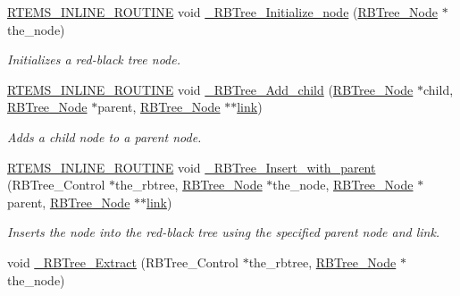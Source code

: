 \begin{DoxyCompactItemize}
\mbox{\hyperlink{group__RTEMSScoreBaseDefs_gac216239df231d5dbd15e3520b0b9313f}{R\+T\+E\+M\+S\+\_\+\+I\+N\+L\+I\+N\+E\+\_\+\+R\+O\+U\+T\+I\+NE}} void \mbox{\hyperlink{group__RTEMSScoreRBTree_gabbc757c2fd03694b6f9bb5aa2be553ff}{\+\_\+\+R\+B\+Tree\+\_\+\+Initialize\+\_\+node}} (\mbox{\hyperlink{structRBTree__Node}{R\+B\+Tree\+\_\+\+Node}} $\ast$the\+\_\+node)
\begin{DoxyCompactList}\small\item\em Initializes a red-\/black tree node. \end{DoxyCompactList}\item 
\mbox{\hyperlink{group__RTEMSScoreBaseDefs_gac216239df231d5dbd15e3520b0b9313f}{R\+T\+E\+M\+S\+\_\+\+I\+N\+L\+I\+N\+E\+\_\+\+R\+O\+U\+T\+I\+NE}} void \mbox{\hyperlink{group__RTEMSScoreRBTree_ga19978673ca0cb615f8228e4888d2c53c}{\+\_\+\+R\+B\+Tree\+\_\+\+Add\+\_\+child}} (\mbox{\hyperlink{structRBTree__Node}{R\+B\+Tree\+\_\+\+Node}} $\ast$child, \mbox{\hyperlink{structRBTree__Node}{R\+B\+Tree\+\_\+\+Node}} $\ast$parent, \mbox{\hyperlink{structRBTree__Node}{R\+B\+Tree\+\_\+\+Node}} $\ast$$\ast$\mbox{\hyperlink{link_8c_a8c94afd0b7e5bb4ce95fefd964241f7f}{link}})
\begin{DoxyCompactList}\small\item\em Adds a child node to a parent node. \end{DoxyCompactList}\item 
\mbox{\hyperlink{group__RTEMSScoreBaseDefs_gac216239df231d5dbd15e3520b0b9313f}{R\+T\+E\+M\+S\+\_\+\+I\+N\+L\+I\+N\+E\+\_\+\+R\+O\+U\+T\+I\+NE}} void \mbox{\hyperlink{group__RTEMSScoreRBTree_ga4fd457fb2e3eaacda2c13a5ab05a11e7}{\+\_\+\+R\+B\+Tree\+\_\+\+Insert\+\_\+with\+\_\+parent}} (R\+B\+Tree\+\_\+\+Control $\ast$the\+\_\+rbtree, \mbox{\hyperlink{structRBTree__Node}{R\+B\+Tree\+\_\+\+Node}} $\ast$the\+\_\+node, \mbox{\hyperlink{structRBTree__Node}{R\+B\+Tree\+\_\+\+Node}} $\ast$parent, \mbox{\hyperlink{structRBTree__Node}{R\+B\+Tree\+\_\+\+Node}} $\ast$$\ast$\mbox{\hyperlink{link_8c_a8c94afd0b7e5bb4ce95fefd964241f7f}{link}})
\begin{DoxyCompactList}\small\item\em Inserts the node into the red-\/black tree using the specified parent node and link. \end{DoxyCompactList}\item 
void \mbox{\hyperlink{group__RTEMSScoreRBTree_ga26bf30d26e521f0599ae0467abdacc85}{\+\_\+\+R\+B\+Tree\+\_\+\+Extract}} (R\+B\+Tree\+\_\+\+Control $\ast$the\+\_\+rbtree, \mbox{\hyperlink{structRBTree__Node}{R\+B\+Tree\+\_\+\+Node}} $\ast$the\+\_\+node)

\end{DoxyCompactItemize}
